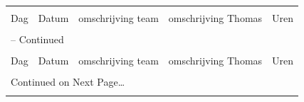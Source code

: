 \documentclass[12pt,a4paper]{report}
\begin{document}
\begin{landscape}
\begin{longtable}{llp{7cm}p{10cm}l}
\hline \hline \\[-2ex]
  \multicolumn{1}{l}{Dag} & \multicolumn{1}{l}{Datum} &
  \multicolumn{1}{p{7cm}}{omschrijving team} &
  \multicolumn{1}{p{10cm}}{omschrijving Thomas} &
  \multicolumn{1}{l}{Uren}  \\[0.5ex] \hline \\[-1.8ex]
\endfirsthead

\multicolumn{5}{l}{{\tablename} \thetable{} -- Continued} \\[0.5ex]
\hline \hline \\[-2ex]
  \multicolumn{1}{l}{Dag} & \multicolumn{1}{l}{Datum} &
  \multicolumn{1}{p{7cm}}{omschrijving team} &
  \multicolumn{1}{p{10cm}}{omschrijving Thomas} &
  \multicolumn{1}{l}{Uren}  \\[0.5ex] \hline \\[-1.8ex]
\endhead

\multicolumn{5}{l}{{Continued on Next Page\ldots}} \\
\endfoot


\end{longtable}
\end{landscape}
\end{document}
